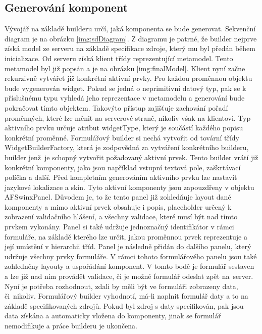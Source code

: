 \subsection{Generování komponent}
Vývojář na základě builderu určí, jaká komponenta se bude generovat. Sekvenční diagram je na obrázku \ref{img:sdDiagram}. Z diagramu je patrné, že builder nejprve získá model ze serveru na základě specifikace zdroje, který mu byl předán během inicializace. Od serveru získá klient třídy reprezentující metamodel. Tento metamodel byl již popsán a je na obrázku \ref{img:finalModel}. Klient nyní začne rekurzivně vytvářet již konkrétní aktivní prvky. Pro každou proměnnou objektu bude vygenerován widget. Pokud se jedná o neprimitivní datový typ, pak se k příslušnému typu vyhledá jeho reprezentace v metamodelu a generování bude pokračovat tímto objektem. Takovýto přístup zajišťuje zachování pořadí proměnných, které lze měnit na serverové straně, nikoliv však na klientovi. Typ aktivního prvku určuje atribut widgetType, který je součástí každého popisu konkrétní proměnné. Formulářový builder si nechá vytvořit od tovární třídy WidgetBuilderFactory, která je zodpovědná za vytváření konkrétního builderu, builder jenž~je schopný vytvořit požadovaný aktivní prvek. Tento builder vrátí již konkrétní komponenty, jako jsou například vstupní textová pole, zaškrtávací políčka a další. Před kompletním generováním aktivního prvku lze nastavit jazykové lokalizace a skin. Tyto aktivní komponenty jsou zapouzdřeny v objektu AFSwinxPanel. Důvodem je, to že tento panel již zohledňuje layout dané komponenty a mimo aktivní prvek obsahuje i popis, placeholder určený k zobrazení validačního hlášení, a všechny validace, které musí být nad tímto prvkem vykonány. Panel si také udržuje jednoznačný identifikátor v rámci formuláře, na základě kterého lze určit, jakou proměnnou prvek reprezentuje a její umístění v hierarchii tříd. Panel je následně přidán do dalšího panelu, který udržuje všechny prvky formuláře. V rámci tohoto formulářového panelu jsou také zohledněny layouty a uspořádání komponent. V tomto bodě je formulář sestaven a lze již nad ním provádět validace, či je možné formulář odeslat zpět na~server. Nyní je potřeba rozhodnout, zdali by měli být ve formuláři zobrazeny data, či~nikoliv. Formulářový builder vyhodnotí, má-li naplnit formulář daty a to na základě specifikovaných zdrojů. Pokud byl zdroj s daty specifikován, pak jsou data získána a automaticky vložena do komponenty, jinak se formulář nemodifikuje a práce builderu je ukončena.


